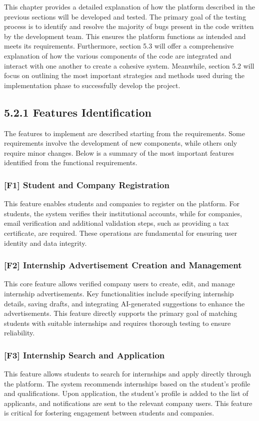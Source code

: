 This chapter provides a detailed explanation of how the platform described in the previous sections will be developed and tested. The primary goal of the testing process is to identify and resolve the majority of bugs present in the code written by the development team. This ensures the platform functions as intended and meets its requirements. Furthermore, section 5.3 will offer a comprehensive explanation of how the various components of the code are integrated and interact with one another to create a cohesive system. Meanwhile, section 5.2 will focus on outlining the most important strategies and methods used during the implementation phase to successfully develop the project.


\subsection{5.2.1 Features Identification}
The features to implement are described starting from the requirements. Some requirements involve the development of new components, while others only require minor changes. Below is a summary of the most important features identified from the functional requirements.

\subsubsection*{[F1] Student and Company Registration}
This feature enables students and companies to register on the platform. For students, the system verifies their institutional accounts, while for companies, email verification and additional validation steps, such as providing a tax certificate, are required. These operations are fundamental for ensuring user identity and data integrity.

\subsubsection*{[F2] Internship Advertisement Creation and Management}
This core feature allows verified company users to create, edit, and manage internship advertisements. Key functionalities include specifying internship details, saving drafts, and integrating AI-generated suggestions to enhance the advertisements. This feature directly supports the primary goal of matching students with suitable internships and requires thorough testing to ensure reliability.

\subsubsection*{[F3] Internship Search and Application}
This feature allows students to search for internships and apply directly through the platform. The system recommends internships based on the student’s profile and qualifications. Upon application, the student’s profile is added to the list of applicants, and notifications are sent to the relevant company users. This feature is critical for fostering engagement between students and companies.

